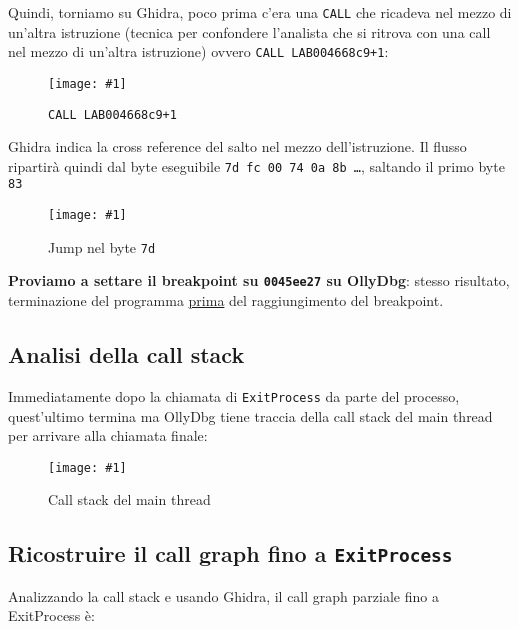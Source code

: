 \documentclass[
    a4paper, %
    11pt %
]{article}
\newcommand{\pic}[4]{\begin{figure}[H]
            \centering
            \texttt{[image: \#1]}
            \caption{#2}
            \label{fig:#1}
            \end{figure}}
\begin{document}
            Quindi, torniamo su Ghidra, poco prima c'era una \texttt{CALL}
            che ricadeva nel mezzo di un'altra istruzione (tecnica per confondere l'analista che 
            si ritrova con una call nel mezzo di un'altra istruzione) ovvero \texttt{CALL LAB\textunderscore004668c9+1}:
            \pic{suspect_entry}{\texttt{CALL LAB\textunderscore004668c9+1}}{12.5cm}{4cm}
            Ghidra indica la cross reference del salto nel mezzo dell'istruzione. Il flusso ripartirà quindi
            dal byte eseguibile \texttt{7d fc 00 74 0a 8b \dots}, saltando il primo byte \texttt{83}
            \pic{suspect_midinstr}{Jump nel byte \texttt{7d}}{12.5cm}{4cm}

            \textbf{Proviamo a settare il breakpoint su \texttt{0045ee27} su OllyDbg}:
            stesso risultato, terminazione del programma \underline{prima} del
            raggiungimento del breakpoint.

            \subsection{Analisi della call stack}
            Immediatamente dopo la chiamata di \texttt{ExitProcess} da parte
            del processo, quest'ultimo termina ma OllyDbg tiene traccia della
            call stack del main thread per arrivare alla chiamata finale:
            \pic{callstack}{Call stack del main thread}{13cm}{4.5cm}

            \subsection{Ricostruire il call graph fino a \texttt{ExitProcess}}
            Analizzando la call stack e usando Ghidra, il call graph parziale fino a ExitProcess è:

            \begin{center}
            \end{center}
\end{document}
